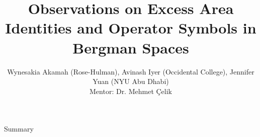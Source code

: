 \documentclass{reu_beamer}
\title[]{Observations on Excess Area Identities and Operator Symbols in Bergman Spaces}
\author{
    Wynesakia Akamah (Rose-Hulman), Avinash Iyer (Occidental College), Jennifer Yuan (NYU Abu Dhabi) \\
    Mentor: Dr. Mehmet \c{C}elik
}
\institute{Occidental College}
\date{}
\begin{document}
\begin{frame}
    \begin{figure}[h]
        \centering
    \end{figure}
    \maketitle
\end{frame}
\begin{frame}{Summary}
\tableofcontents
\end{frame}
\end{document}
